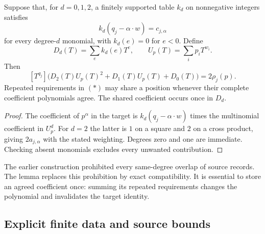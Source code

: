\begin{lemma}
Suppose that, for $d=0,1,2$, a finitely supported table $k_d$ on
nonnegative integers satisfies
\[
 k_d(q_j-\alpha\cdot w)=c_{j,\alpha}
 \tag{\(*\)}
\]
for every degree-$d$ monomial, with $k_d(e)=0$ for $e<0$. Define
\[
 D_d(T)=\sum_e k_d(e)T^e,\qquad U_p(T)=\sum_i p_iT^{w_i}.
\]
Then
\[
 [T^{q_j}]\bigl(D_2(T)U_p(T)^2+D_1(T)U_p(T)+D_0(T)\bigr)
   =2\rho_j(p).
\]
Repeated requirements in \((*)\) may share a position whenever their
complete coefficient polynomials agree. The shared coefficient occurs
once in $D_d$.
\end{lemma}
\begin{proof}
The coefficient of $p^\alpha$ in the target is
$k_d(q_j-\alpha\cdot w)$ times the multinomial coefficient in $U_p^d$.
For $d=2$ the latter is $1$ on a square and $2$ on a cross product, giving
$2a_{j,\alpha}$ with the stated weighting. Degrees zero and one are
immediate. Checking absent monomials excludes every unwanted contribution.
\end{proof}

The earlier construction prohibited every same-degree overlap of source
records. The lemma replaces this prohibition by exact compatibility. It
is essential to store an agreed coefficient once: summing its repeated
requirements changes the polynomial and invalidates the target identity.

\subsection{Explicit finite data and source bounds}

